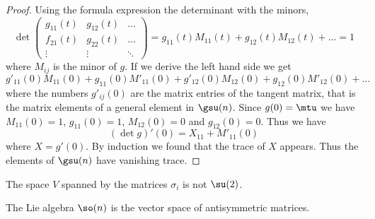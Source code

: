 \begin{proof}
    Using the formula expression the determinant with the minors,
    \begin{equation}
        \det\begin{pmatrix}
            g_{11}(t)    &   g_{12}(t)    &   \ldots    \\
            f_{21}(t)    &   g_{22}(t)    &   \ldots    \\
            \vdots    &   \vdots    &   \ddots
        \end{pmatrix}=g_{11}(t)M_{11}(t)+g_{12}(t)M_{12}(t)+\ldots=1
    \end{equation}
    where \( M_{ij}\) is the minor of \( g\). If we derive the left hand side we get
    \begin{equation}
        g'_{11}(0)M_{11}(0)+g_{11}(0)M'_{11}(0)+g'_{12}(0)M_{12}(0)+g_{12}(0)M'_{12}(0)+\ldots
    \end{equation}
    where the numbers \( g'_{ij}(0)\) are the matrix entries of the tangent matrix, that is the matrix elements of a general element in \( \gsu(n)\). Since \( g(0)=\mtu\) we have \( M_{11}(0)=1\), \( g_{11}(0)=1\), \( M_{12}(0)=0\) and \( g_{12}(0)=0\). Thus we have
    \begin{equation}
        (\det g)'(0)=X_{11}+M'_{11}(0)
    \end{equation}
    where \( X=g'(0)\). By induction we found that the trace of \( X\) appears. Thus the elements of \( \gsu(n)\) have vanishing trace.
\end{proof}

\begin{normaltext}
    The space \( V\) spanned by the matrices \( \sigma_i\) is not \( \su(2)\).
\end{normaltext}

\begin{proposition}     \label{PROPooDNNEooMOdrkq}
    The Lie algebra \( \so(n)\) is the vector space of antisymmetric matrices.
\end{proposition}

